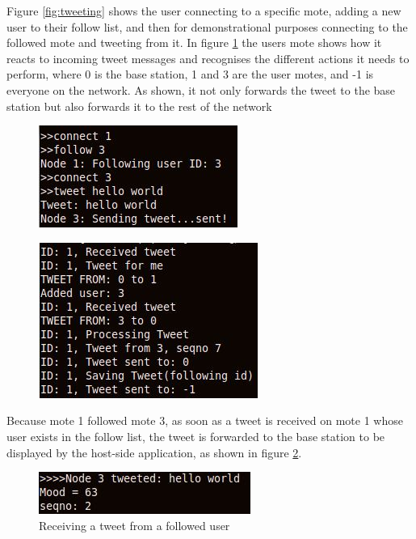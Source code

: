 \documentclass{article}
\begin{document}
Figure \ref{fig:tweeting} shows the user connecting to a specific mote, adding a new user to their follow list, and then for demonstrational purposes connecting to the followed mote and tweeting from it. In figure \ref{fig:motetweeting} the users mote shows how it reacts to incoming tweet messages and recognises the different actions it needs to perform, where 0 is the base station, 1 and 3 are the user motes, and -1 is everyone on the network. As shown, it not only forwards the tweet to the base station but also forwards it to the rest of the network
\begin{figure}[htb!]

\begin{minipage}{.5\textwidth}
\begin{center}
    \includegraphics[scale=.6]{img/tweet.jpg}
    \centering
	\label{fig:tweeting}
	\end{center}
    \end{minipage}%
    \begin{minipage}{.5\textwidth}
    \begin{center}
    \includegraphics[scale=.5]{img/motetweet.jpg}
    \label{fig:motetweeting}
\end{center}

\end{minipage}

\end{figure}

Because mote 1 followed mote 3, as soon as a tweet is received on mote 1 whose user exists in the follow list, the tweet is forwarded to the base station to be displayed by the host-side application, as shown in figure \ref{fig:receive}.
\begin{figure}[htb!]
\centering
\includegraphics[scale=.7]{img/receive.jpg}
\caption{Receiving a tweet from a followed user}
\label{fig:receive}
\end{figure}
\end{document}
